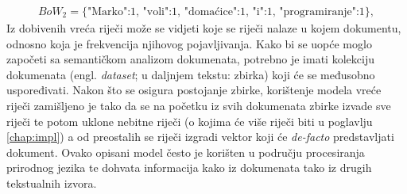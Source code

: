 \documentclass[times, utf8, zavrsni, numeric]{fer}
\begin{document}
\begin{align*}
{{BoW_{2}}=\{\text{{"Marko":1, "voli":1, "domaćice":1, "i":1, "programiranje":1}}}\},
\end{align*}
Iz dobivenih vreća riječi može se vidjeti koje se riječi nalaze u kojem dokumentu, odnosno koja je frekvencija njihovog pojavljivanja. \newline
Kako bi se uopće moglo započeti sa semantičkom analizom dokumenata, potrebno je imati kolekciju dokumenata (engl. \textit{dataset}; u daljnjem tekstu: zbirka) koji će se međusobno uspoređivati. Nakon što se osigura postojanje zbirke, korištenje modela vreće riječi zamišljeno je tako da se na početku iz svih dokumenata zbirke izvade sve riječi te potom uklone nebitne riječi (o kojima će više riječi biti u poglavlju \ref{chap:impl}) a od preostalih se riječi izgradi vektor koji će \textit{de-facto} predstavljati dokument. Ovako opisani model često je korišten u području procesiranja prirodnog jezika te dohvata informacija kako iz dokumenata tako iz drugih tekstualnih izvora.
\end{document}
